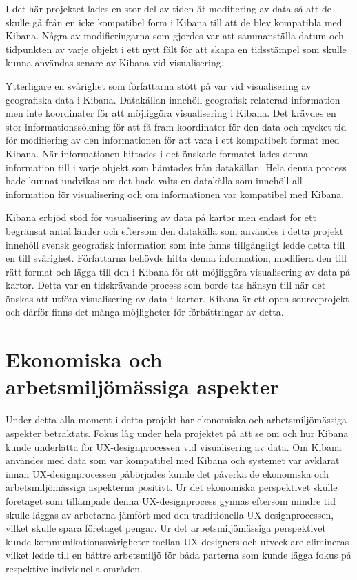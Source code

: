 \documentclass[12pt]{kththesis}
\begin{document}
I det här projektet lades en stor del av tiden åt modifiering av data så att de skulle gå från en icke kompatibel form i Kibana till att de blev kompatibla med Kibana. Några av modifieringarna som gjordes var att sammanställa datum och tidpunkten av varje objekt i ett nytt fält för att skapa en tidsstämpel som skulle kunna användas senare av Kibana vid visualisering. 

Ytterligare en svårighet som författarna stött på var vid visualisering av geografiska data i Kibana. Datakällan innehöll geografisk relaterad information men inte koordinater för att möjliggöra visualisering i Kibana. Det krävdes en stor informationssökning för att få fram koordinater för den data och mycket tid för modifiering av den informationen för att vara i ett kompatibelt format med Kibana. När informationen hittades i det önskade formatet lades denna information till i varje objekt som hämtades från datakällan. Hela denna process hade kunnat undvikas om det hade valts en datakälla som innehöll all information för visualisering och om informationen var kompatibel med Kibana.

Kibana erbjöd stöd för visualisering av data på kartor men endast för ett begränsat antal länder och eftersom den datakälla som användes i detta projekt innehöll svensk geografisk information som inte fanns tillgängligt ledde detta till en till svårighet. Författarna behövde hitta denna information, modifiera den till rätt format och lägga till den i Kibana för att möjliggöra visualisering av data på kartor. Detta var en tidskrävande process som borde tas hänsyn till när det önskas att utföra visualisering av data i kartor. Kibana är ett open-sourceprojekt och därför finns det många möjligheter för förbättringar av detta.  

\section{Ekonomiska och arbetsmiljömässiga aspekter}
Under detta alla moment i detta projekt har ekonomiska och arbetsmiljömässiga aspekter betraktats. Fokus låg under hela projektet på att se om och hur Kibana kunde underlätta för UX-designprocessen vid visualisering av data. Om Kibana användes med data som var kompatibel med Kibana och systemet var avklarat innan UX-designprocessen påbörjades kunde det påverka de ekonomiska och arbetsmiljömässiga aspekterna positivt. Ur det ekonomiska perspektivet skulle företaget som tillämpade denna UX-designprocess gynnas eftersom mindre tid skulle läggas av arbetarna jämfört med den traditionella UX-designprocessen, vilket skulle spara företaget pengar. Ur det arbetsmiljömässiga perspektivet kunde kommunikationssvårigheter mellan UX-designers och utvecklare elimineras vilket ledde till en bättre arbetsmiljö för båda parterna som kunde lägga fokus på respektive individuella områden.
\end{document}
